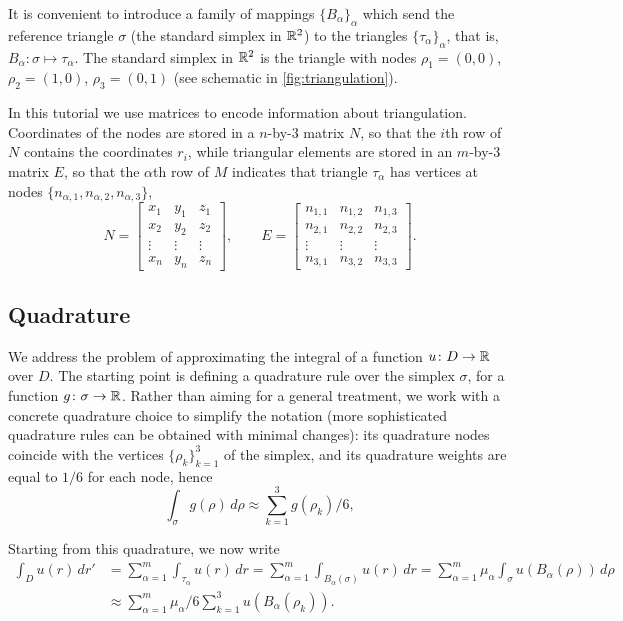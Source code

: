 \documentclass[a4paper]{siamonline220329}
\theoremstyle{plain}
\begin{document}
It is convenient to introduce a family of mappings $\{ B_\alpha \}_{\alpha}$ which
send the reference triangle $\sigma$ (the standard simplex in $\mathbb{R}^2$) to the
triangles $\{\tau_\alpha\}_{\alpha}$, that is, $B_\alpha \colon \sigma \mapsto \tau_{\alpha}$.
The standard simplex in $\mathbb{R}^2$ is the triangle with nodes $\rho_1=(0,0)$,
$\rho_2=(1,0)$, $\rho_3=(0,1)$ (see schematic in \cref{fig:triangulation}).

In this tutorial we use matrices to encode information about triangulation.
Coordinates of the nodes are stored in a $n$-by-$3$ matrix $N$, so
that the $i$th row of $N$ contains the coordinates $r_i$, while triangular elements
are stored in an $m$-by-$3$ matrix $E$, so that the $\alpha$th row of $M$ indicates
that triangle $\tau_\alpha$ has vertices at nodes $\{ n_{\alpha,1},
  n_{\alpha,2}, n_{\alpha,3}\}$,
\[
  N =
  \begin{bmatrix} 
    x_1 & y_1 & z_1 \\
    x_2 & y_2 & z_2 \\
    \vdots & \vdots & \vdots \\
    x_n & y_n & z_n
  \end{bmatrix}, 
  \qquad 
  E =
  \begin{bmatrix} 
    n_{1,1} & n_{1,2} & n_{1,3}\\
    n_{2,1} & n_{2,2} & n_{2,3}\\
    \vdots & \vdots & \vdots \\
    n_{3,1} & n_{3,2} & n_{3,3}
  \end{bmatrix}.
\]

\subsection{Quadrature}\label{ssec:quadrature} We address the problem of
approximating the integral of a function $u \colon D \to \mathbb{R}$ over $D$. The
starting point is defining a quadrature rule over the simplex $\sigma$, for a
function $g \colon \sigma \to \mathbb{R}$. Rather than aiming for a general treatment,
we work with a concrete quadrature choice to simplify the notation (more
sophisticated quadrature rules can be obtained with minimal changes): its quadrature
nodes coincide with the vertices $\{ \rho_k \}_{k=1}^3$ of the simplex,
and its quadrature weights are equal to $1/6$ for each node, hence
\[
  \int_{\sigma} g(\rho) \,d \rho \approx
  \sum_{k=1}^3 g(\rho_k)/6, 
\]

Starting from this quadrature, we now write
\[
  \begin{aligned}
  \int_{D} u(r) \,d r'
  &
  = \sum_{\alpha=1}^m \int_{\tau_\alpha} u(r) \,d r 
  = \sum_{\alpha=1}^m \int_{B_\alpha(\sigma)} u(r) \,dr
  = \sum_{\alpha=1}^m \mu_\alpha \int_{\sigma} u(B_\alpha(\rho)) \,d\rho
  \\
  &
  \approx
  \sum_{\alpha=1}^m \mu_\alpha/6 \sum_{k=1}^3 u(B_\alpha(\rho_k)).
   \\
  \end{aligned}
\]
\end{document}
